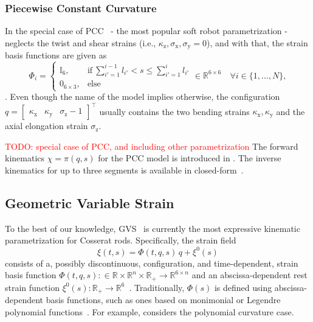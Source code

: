 \subsubsection{Piecewise Constant Curvature}
In the special case of \gls{PCC}~\citep{webster2010design} - the most popular soft robot parametrization - neglects the twist and shear strains (i.e., $\kappa_\mathrm{z}, \sigma_\mathrm{x}, \sigma_\mathrm{y} = 0$), and with that, the strain basis functions are given as
\begin{equation}
    \Phi_i = \begin{cases}
        \mathbb{I}_{6}, & \text{if} \: \sum_{i'=1}^{i-1} l_{i'} < s \leq \sum_{i'= 1}^{i} l_{i'} \\
        0_{6\times 3}, & \text{else}
    \end{cases} \in \mathbb{R}^{6 \times 6} \quad \forall i \in \{ 1,\dots, N \},
\end{equation}.
Even though the name of the model implies otherwise, the configuration $q=\begin{bmatrix}
    \kappa_\mathrm{x} &\kappa_\mathrm{y} & \sigma_\mathrm{z}-1
\end{bmatrix}^\top$ usually contains the two bending strains $\kappa_\mathrm{x}, \kappa_\mathrm{y}$ and the axial elongation strain $\sigma_\mathrm{z}$.

\textcolor{red}{TODO: special case of PCC, and including other parametrization}
The forward kinematics $\chi=\pi(q,s)$ for the \gls{PCC} model is introduced in \citet{webster2010design, della2020improved}. The inverse kinematics for up to three segments is available in closed-form~\citep{li2023kinematics}.


\subsection{Geometric Variable Strain}
To the best of our knowledge, \gls{GVS}~\citep{renda2020geometric, boyer2020dynamics, mathew2025reduced} is currently the most expressive kinematic parametrization for Cosserat rods. Specifically, the strain field
\begin{equation}
    \xi(t,s) = \Phi(t,q,s) \, q + \xi^0(s)
\end{equation}
consists of a, possibly discontinuous, configuration, and time-dependent, strain basis function $\Phi(t,q,s): \in \mathbb{R} \times \mathbb{R}^n \times \mathbb{R}_+ \to \mathbb{R}^{6 \times n}$ and an abscissa-dependent rest strain function $\xi^0(s): \mathbb{R}_+ \to \mathbb{R}^6$~\citep{mathew2025reduced}.
Traditionally, $\Phi(s)$ is defined using abscissa-dependent basis functions, such as ones based on monimonial or Legendre polynomial functions~\citep{mathew2025reduced}. For example, \citet{della2019control} considers the polynomial curvature case.

